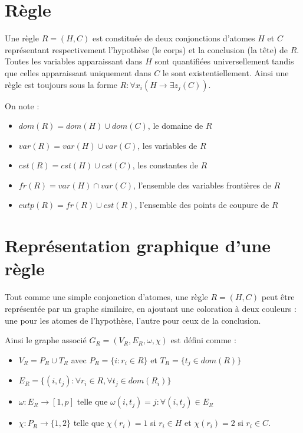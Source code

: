 
\section{R\`egle}\label{def_regle}
Une règle $R = (H,C)$ est constituée de deux conjonctions d'atomes $H$ et $C$ représentant
respectivement l'hypothèse (le corps) et la conclusion (la tête) de $R$.
Toutes les variables apparaissant dans $H$ sont quantifiées universellement tandis que
celles apparaissant uniquement dans $C$ le sont existentiellement.
Ainsi une règle est toujours sous la forme 
$R : \forall x_i (H \rightarrow \exists z_j (C))$.

On note :
\begin{itemize}
	\item $dom(R) = dom(H) \cup dom(C)$, le domaine de $R$
	\item $var(R) = var(H) \cup var(C)$, les variables de $R$
	\item $cst(R) = cst(H) \cup cst(C)$, les constantes de $R$
	\item $fr(R) = var(H) \cap var(C)$, l'ensemble des variables fronti\`eres de $R$
	\item $cutp(R) = fr(R) \cup cst(R)$, l'ensemble des points de coupure de $R$\\
\end{itemize}

\section{Représentation graphique d'une règle}
\label{def_representation_regle}
Tout comme une simple conjonction d'atomes, une règle $R = (H,C)$ peut être représentée
par un graphe similaire, en ajoutant une coloration à deux couleurs : une pour les atomes de
l'hypothèse, l'autre pour ceux de la conclusion.

Ainsi le graphe associé $G_R = (V_R,E_R,\omega,\chi)$ est défini comme :
\begin{itemize}
	\item 
		$V_{R} = P_R \cup T_{R}$ avec $P_R = \{i : r_{i} \in R\}$ et $T_{R} = 
		\{t_{j} \in dom(R)\}$
	\item 
		$E_{R} = \{(i,t_{j}) : \forall r_{i} \in R, \forall t_{j} \in dom(R_{i})\}$
	\item 
		$\omega : E_R \rightarrow [1,p]$ telle que
		$\omega(i,t_{j}) = j : \forall (i,t_{j}) \in E_{R}$
	\item 
		$\chi : P_R \rightarrow \{1,2\}$ telle que 
		$\chi(r_i) = 1$ si $r_i \in H$ et $\chi(r_i) = 2$ si $r_i \in C$.\\
\end{itemize}
\par{}


